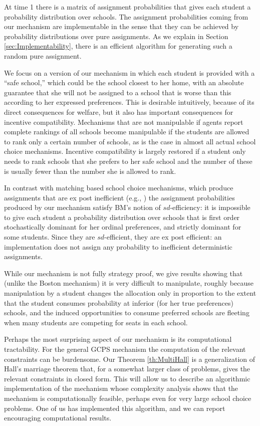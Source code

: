 \documentclass[12pt]{article}
\theoremstyle{definition}
\begin{document}
At time 1 there is a matrix of assignment probabilities that gives each student a probability distribution over schools. 
The assignment probabilities coming from our mechanism are implementable \citep{bckm13aer} in the sense that they can be achieved by probability distributions over pure assignments.  As we explain in Section \ref{sec:Implementability}, there is an efficient algorithm for generating such a random pure assignment.

We focus on a version of our mechanism in which each student is provided with a ``safe school,'' which could be the school closest to her home, with an absolute guarantee that she will not be assigned to a school that is worse than this according to her expressed preferences.  This is desirable intuitively, because of its direct consequences for welfare, but it also has important consequences for incentive compatibility.  Mechanisms that are not manipulable if agents report complete rankings of all schools become manipulable if the students are allowed to rank only a certain number of schools, as is the case in almost all actual school choice mechanisms.  Incentive compatibility is largely restored if a student only needs to rank schools that she prefers to her safe school and the number of these is usually fewer than the number she is allowed to rank.

In contrast with matching based school choice mechanisms, which produce assignments that are ex post inefficient (e.g., \cite{apr09aer}) the assignment probabilities produced by our mechanism satisfy BM's notion of $sd$-efficiency: it is impossible to give each student a probability distribution over schools that is first order stochastically dominant for her ordinal preferences, and strictly dominant for some students.   Since they are $sd$-efficient, they are ex post efficient: an implementation does not assign any probability to inefficient deterministic assignments.  

While our mechanism is not fully strategy proof, we give results showing that (unlike the Boston mechanism) it is very difficult to manipulate, roughly because manipulation by a student changes the allocation only in proportion to the extent that the student consumes probability at inferior (for her true preferences) schools, and the induced opportunities to consume preferred schools are fleeting when many students are competing for seats in each school.

Perhaps the most surprising aspect of our mechanism is its computational tractability.  For the general GCPS mechanism the computation of the relevant constraints can be burdensome.  Our Theorem \ref{th:MultiHall} is a generalization of Hall's marriage theorem that, for a somewhat larger class of problems, gives the relevant constraints in closed form.  This will allow us to describe an algorithmic implementation of the mechanism whose complexity analysis shows that the mechanism is computationally feasible, perhaps even for very large school choice problems.  One of us has implemented this algorithm, and we can report encouraging computational results.  
\end{document}
